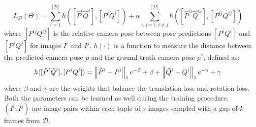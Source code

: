 \small
\begin{equation}
    L_\mathcal{D}(\Theta) = \sum\limits_{i=1}^{|\mathcal{D}|} h([\hat{P}^i \hat{Q}^i], [P^i Q^i]) + \alpha\sum\limits_{i,j=1, i\neq j}^{|\mathcal{D}|} h([\hat{P}^{ij} \hat{Q}^{ij}], [P^{ij} Q^{ij}])
    \label{eq:mapnet-loss}
\end{equation}
\normalsize
where $[P^{ij} Q^{ij}]$ is the relative camera pose between pose predictions $[P^i Q^i]$ and $[P^j Q^j]$ for images $I^i$ and $I^j$.
$h(\cdot)$ is a function to measure the distance between the predicted camera pose $p$ and the ground truth camera pose $p^*$, defined as:
\small
\begin{equation}
    h([\hat{P}^i \hat{Q}^i], [P^i Q^i]) = \norm{\hat{P}^i-P^i}_1 e^{-\beta} + \beta + \norm{\hat{Q}^i-Q^i}_1 e^{-\gamma} + \gamma
    \label{eq:mapnet-loss-h}
\end{equation}
\normalsize
where $\beta$ and $\gamma$ are the weights that balance the translation loss and rotation loss. Both the parameters can be learned as well during the training procedure. $(I^i, I^j)$ are image pairs within each tuple of $s$ images sampled with a gap of $k$ frames from $\mathcal{D}$.
